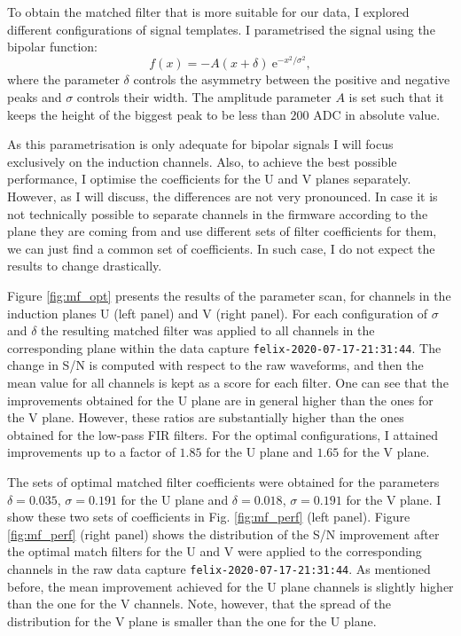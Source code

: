 To obtain the matched filter that is more suitable for our data, I explored different configurations of signal templates. I parametrised the signal using the bipolar function:
\begin{equation}\label{2.4.13}
	f(x) = -A (x + \delta) \ \mathrm{e}^{-x^{2}/\sigma^{2}},
\end{equation}
where the parameter $\delta$ controls the asymmetry between the positive and negative peaks and $\sigma$ controls their width. The amplitude parameter $A$ is set such that it keeps the height of the biggest peak to be less than $200$ ADC in absolute value.

As this parametrisation is only adequate for bipolar signals I will focus exclusively on the induction channels. Also, to achieve the best possible performance, I optimise the coefficients for the U and V planes separately. However, as I will discuss, the differences are not very pronounced. In case it is not technically possible to separate channels in the firmware according to the plane they are coming from and use different sets of filter coefficients for them, we can just find a common set of coefficients. In such case, I do not expect the results to change drastically.

Figure \ref{fig:mf_opt} presents the results of the parameter scan, for channels in the induction planes U (left panel) and V (right panel). For each configuration of $\sigma$ and $\delta$ the resulting matched filter was applied to all channels in the corresponding plane within the data capture \texttt{felix-2020-07-17-21:31:44}. The change in S/N is computed with respect to the raw waveforms, and then the mean value for all channels is kept as a score for each filter. One can see that the improvements obtained for the U plane are in general higher than the ones for the V plane. However, these ratios are substantially higher than the ones obtained for the low-pass FIR filters. For the optimal configurations, I attained improvements up to a factor of $1.85$ for the U plane and $1.65$ for the V plane.

The sets of optimal matched filter coefficients were obtained for the parameters $\delta = 0.035$, $\sigma = 0.191$ for the U plane and $\delta = 0.018$, $\sigma = 0.191$ for the V plane. I show these two sets of coefficients in Fig. \ref{fig:mf_perf} (left panel). Figure \ref{fig:mf_perf} (right panel) shows the distribution of the S/N improvement after the optimal match filters for the U and V were applied to the corresponding channels in the raw data capture \texttt{felix-2020-07-17-21:31:44}. As mentioned before, the mean improvement achieved for the U plane channels is slightly higher than the one for the V channels. Note, however, that the spread of the distribution for the V plane is smaller than the one for the U plane.

